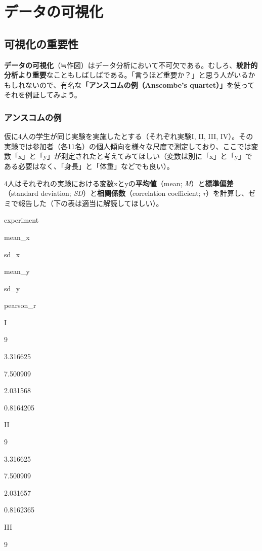 \documentclass[]{book}
\begin{document}
\part*{データの可視化}\label{part-}

\chapter{可視化の重要性}\label{introduction}

\textbf{データの可視化}（≒作図）はデータ分析において不可欠である。むしろ、\textbf{統計的分析より重要}なこともしばしばである。「言うほど重要か？」と思う人がいるかもしれないので、有名な\textbf{「アンスコムの例（Anscombe's
quartet）」}を使ってそれを例証してみよう。

\section{アンスコムの例}

仮に4人の学生が同じ実験を実施したとする（それぞれ実験I, II, III,
IV）。その実験では参加者（各11名）の個人傾向を様々な尺度で測定しており、ここでは変数「x」と「y」が測定されたと考えてみてほしい（変数は別に「x」と「y」である必要はなく、「身長」と「体重」などでも良い）。

4人はそれぞれの実験における変数xとyの\textbf{平均値}（mean;
\emph{M}）と\textbf{標準偏差}（standard deviation;
\emph{SD}）と\textbf{相関係数}（correlation coefficient;
\emph{r}）を計算し、ゼミで報告した（下の表は適当に解読してほしい）。

experiment

mean\_x

sd\_x

mean\_y

sd\_y

pearson\_r

I

9

3.316625

7.500909

2.031568

0.8164205

II

9

3.316625

7.500909

2.031657

0.8162365

III

9
\end{document}
